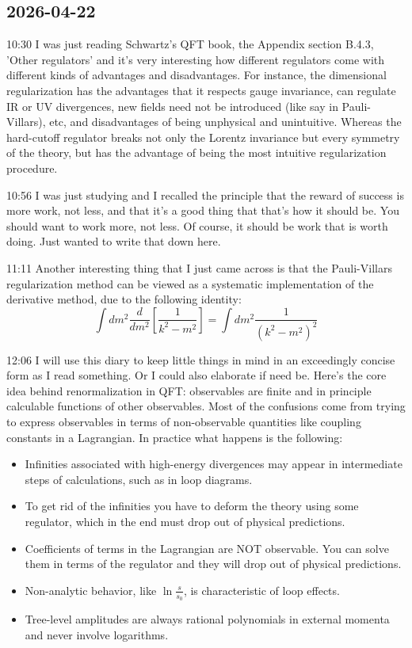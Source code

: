 \documentclass[11pt,a4paper]{article}
\begin{document}
\subsection{2026-04-22}
10:30 I was just reading Schwartz's QFT book, the Appendix section B.4.3, 'Other regulators' and it's very interesting how different regulators come with different kinds of advantages and disadvantages. For instance, the dimensional regularization has the advantages that it respects gauge invariance, can regulate IR or UV divergences, new fields need not be introduced (like say in Pauli-Villars), etc, and disadvantages of being unphysical and unintuitive. Whereas the hard-cutoff regulator breaks not only the Lorentz invariance but every symmetry of the theory, but has the advantage of being the most intuitive regularization procedure. 

10:56 I was just studying and I recalled the principle that the reward of success is more work, not less, and that it's a good thing that that's how it should be. You should want to work more, not less. Of course, it should be work that is worth doing. Just wanted to write that down here.

11:11 Another interesting thing that I just came across is that the Pauli-Villars regularization method can be viewed as a systematic implementation of the derivative method, due to the following identity:
\[
	\int dm ^2 \frac{d}{dm ^2} \left[ \frac{1}{k ^2 - m ^2} \right] = \int dm ^2 \frac{1}{(k ^2 - m ^2) ^2}
\]

12:06 I will use this diary to keep little things in mind in an exceedingly concise form as I read something. Or I could also elaborate if need be. Here's the core idea behind renormalization in QFT: observables are finite and in principle calculable functions of other observables. Most of the confusions come from trying to express observables in terms of non-observable quantities like coupling constants in a Lagrangian. In practice what happens is the following: 
\begin{itemize}
	\item Infinities associated with high-energy divergences may appear in intermediate steps of calculations, such as in loop diagrams. 
	\item To get rid of the infinities you have to deform the theory using some regulator, which in the end must drop out of physical predictions. 
	\item Coefficients of terms in the Lagrangian are NOT observable. You can solve them in terms of the regulator and they will drop out of physical predictions. 
	\item Non-analytic behavior, like $\ln \frac{s}{s_0}$, is characteristic of loop effects. 
	\item Tree-level amplitudes are always rational polynomials in external momenta and never involve logarithms. 
\end{itemize}
\end{document}
